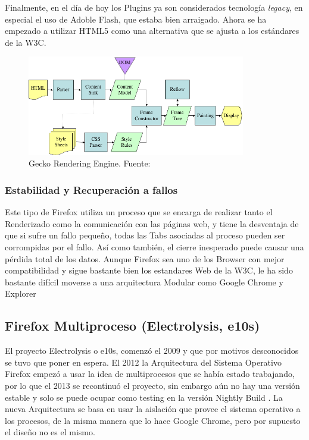         Finalmente, en el día de hoy los Plugins ya son considerados tecnología \textit{legacy}, en especial el uso de Adoble Flash, que estaba bien arraigado. Ahora se ha empezado a utilizar HTML5 como una alternativa que se ajusta a los estándares de la W3C.

        \begin{figure}[h!t]
            \centering
            \includegraphics[width=0.85\textwidth]{figures/Gecko_Overview_9.png}
            \caption{Gecko Rendering Engine. Fuente: \cite{gecko}}
            \label{fig:Gecko}
        \end{figure}

        \subsubsection{Estabilidad y Recuperación a fallos}
        Este tipo de Firefox utiliza un proceso que se encarga de realizar tanto el Renderizado como la comunicación con las páginas web, y tiene la desventaja de que si sufre un fallo pequeño, todas las Tabs asociadas al proceso pueden ser corrompidas por el fallo. Así como también, el cierre inesperado puede causar una pérdida total de los datos. Aunque Firefox sea uno de los Browser con mejor compatibilidad y sigue bastante bien los estandares Web de la W3C, le ha sido bastante difícil moverse a una arquitectura Modular como Google Chrome y Explorer \cite{ElectrolysisTalk}
        
    \subsection{Firefox Multiproceso (Electrolysis, e10s)} 
    El proyecto Electrolysis o e10s, comenzó el 2009 y que por motivos desconocidos \cite{ElectrolysisTalk} se tuvo que poner en espera. El 2012 la Arquitectura del Sistema Operativo Firefox empezó a usar la idea de multiprocesos que se había estado trabajando, por lo que el 2013 se recontinuó el proyecto, sin embargo aún no hay una versión estable y solo se puede ocupar como testing en la versión Nightly Build \cite{NightlyBuilds}. La nueva Arquitectura se basa en usar la aislación que provee el sistema operativo a los procesos, de la misma manera que lo hace Google Chrome, pero por supuesto el diseño no es el mismo.

